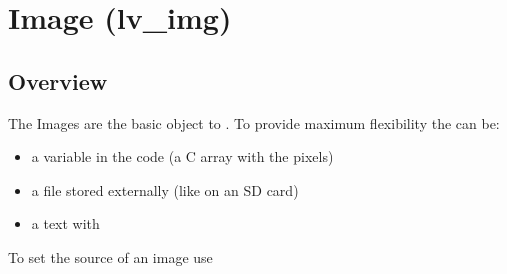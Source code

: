 \documentclass[letterpaper,10pt,english]{sphinxmanual}
\begin{document}
\begin{fulllineitems}
\begin{fulllineitems}
\label{\detokenize{object-types/gauge:_CPPv4N14lv_gauge_ext_t12needle_countE}}%
\pysigstartmultiline
{}%
\pysigstopmultiline
\end{fulllineitems}


\begin{fulllineitems}
\label{\detokenize{object-types/gauge:_CPPv4N14lv_gauge_ext_t11label_countE}}%
\pysigstartmultiline
{}%
\pysigstopmultiline
\end{fulllineitems}


\end{fulllineitems}



\section{Image (lv\_img)}
\label{\detokenize{object-types/img:image-lv-img}}\label{\detokenize{object-types/img::doc}}

\subsection{Overview}
\label{\detokenize{object-types/img:overview}}
The Images are the basic object to . To provide maximum flexibility the  can be:
\begin{itemize}
\item {} 
a variable in the code (a C array with the pixels)

\item {} 
a file stored externally (like on an SD card)

\item {} 
a text with {\hyperref[\detokenize{overview/fonts::doc}]{}}

\end{itemize}

To set the source of an image use 
\end{document}
